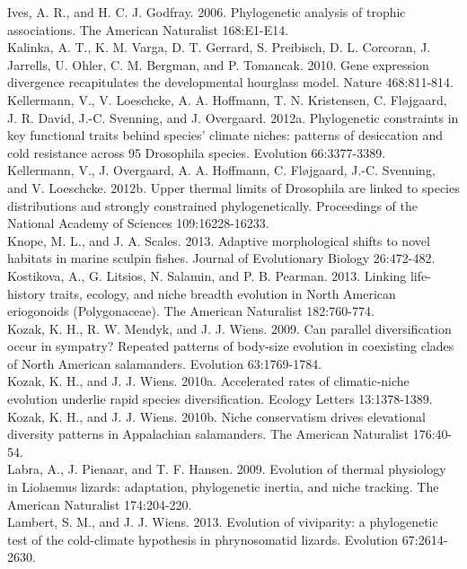 \documentclass[a4paper,12pt]{article}
\begin{document}
Ives, A. R., and H. C. J. Godfray. 2006. Phylogenetic analysis of trophic associations. The American Naturalist 168:E1-E14.\\
Kalinka, A. T., K. M. Varga, D. T. Gerrard, S. Preibisch, D. L. Corcoran, J. Jarrells, U. Ohler, C. M. Bergman, and P. Tomancak. 2010. Gene expression divergence recapitulates the developmental hourglass model. Nature 468:811-814.\\
Kellermann, V., V. Loeschcke, A. A. Hoffmann, T. N. Kristensen, C. Fløjgaard, J. R. David, J.-C. Svenning, and J. Overgaard. 2012a. Phylogenetic constraints in key functional traits behind species' climate niches: patterns of desiccation and cold resistance across 95 Drosophila species. Evolution 66:3377-3389.\\
Kellermann, V., J. Overgaard, A. A. Hoffmann, C. Fløjgaard, J.-C. Svenning, and V. Loeschcke. 2012b. Upper thermal limits of Drosophila are linked to species distributions and strongly constrained phylogenetically. Proceedings of the National Academy of Sciences 109:16228-16233.\\
Knope, M. L., and J. A. Scales. 2013. Adaptive morphological shifts to novel habitats in marine sculpin fishes. Journal of Evolutionary Biology 26:472-482.\\
Kostikova, A., G. Litsios, N. Salamin, and P. B. Pearman. 2013. Linking life-history traits, ecology, and niche breadth evolution in North American eriogonoids (Polygonaceae). The American Naturalist 182:760-774.\\
Kozak, K. H., R. W. Mendyk, and J. J. Wiens. 2009. Can parallel diversification occur in sympatry? Repeated patterns of body-size evolution in coexisting clades of North American salamanders. Evolution 63:1769-1784.\\
Kozak, K. H., and J. J. Wiens. 2010a. Accelerated rates of climatic-niche evolution underlie rapid species diversification. Ecology Letters 13:1378-1389.\\
Kozak, K. H., and J. J. Wiens. 2010b. Niche conservatism drives elevational diversity patterns in Appalachian salamanders. The American Naturalist 176:40-54.\\
Labra, A., J. Pienaar, and T. F. Hansen. 2009. Evolution of thermal physiology in Liolaemus lizards: adaptation, phylogenetic inertia, and niche tracking. The American Naturalist 174:204-220.\\
Lambert, S. M., and J. J. Wiens. 2013. Evolution of viviparity: a phylogenetic test of the cold-climate hypothesis in phrynosomatid lizards. Evolution 67:2614-2630.\\
\end{document}
